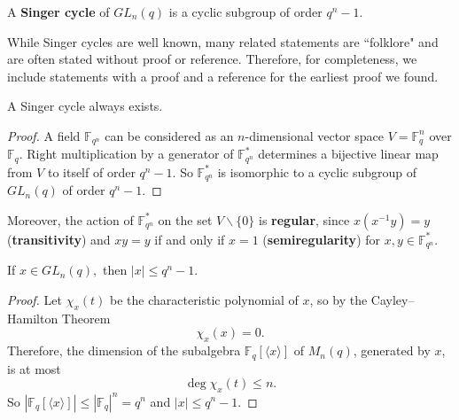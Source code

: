 \begin{Def} A  {\bf Singer cycle}  of $GL_n(q)$ is a cyclic subgroup of order $q^n - 1$.
\end{Def}

While  Singer cycles are well known, many related statements are  ``folklore" and are often stated without  proof or  reference.
Therefore, for completeness, we include statements with a proof and a reference for the earliest proof we found.       


\begin{Lem} \label{singex} 
 A Singer cycle always exists.
\end{Lem}
\begin{proof}
A field $\mathbb{F}_{q^n}$ can be considered as an $n$-dimensional vector space $V=\mathbb{F}_q^n$ over $\mathbb{F}_q.$  Right multiplication by a generator of  $\mathbb{F}_{q^n}^*$ determines a bijective linear map from $V$ to itself of order $q^n-1$. So  $\mathbb{F}_{q^n}^*$  is isomorphic to a cyclic subgroup of $GL_n(q)$ of order $q^n-1$. 
\end{proof}

Moreover, the action of $\mathbb{F}_{q^n}^*$ on the set $V \backslash \{0\}$ is {\bf regular}, since $x(x^{-1}y)=y$ ({\bf transitivity}) and $xy=y$ if and only if $x=1$ ({\bf semiregularity}) for $x,y \in \mathbb{F}_{q^n}^*$.



\begin{Lem}\label{por}
If $x \in GL_n(q),$ then $|x| \le q^n-1$.
\end{Lem}
\begin{proof}
 Let $\chi_x(t)$ be the characteristic polynomial of $x$, so by the Cayley--Hamilton Theorem $$\chi_x(x)=0.$$ Therefore,  the dimension of the subalgebra $\mathbb{F}_q[\langle x \rangle]$ of $M_n(q)$, generated by $x$, is at most 
$$\deg \chi_x(t) \le n.$$ So $|\mathbb{F}_q[\langle x \rangle]|\le|\mathbb{F}_q|^n=q^n$ and $|x|\le q^n-1.$
\end{proof}

